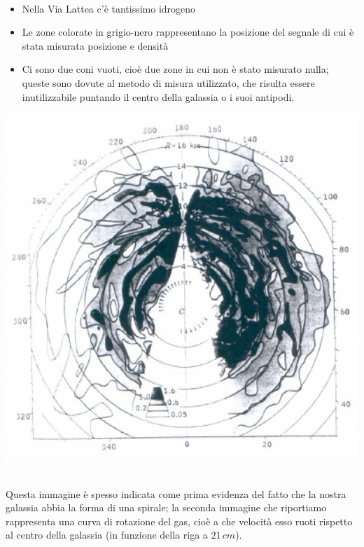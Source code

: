 \vspace{0.05cm}\\
\begin{minipage}{.65\textwidth}
\begin{itemize}
	\item Nella Via Lattea c'è tantissimo idrogeno
	\item Le zone colorate in grigio-nero rappresentano la posizione del segnale di cui è stata misurata posizione e densità
	\item Ci sono due coni vuoti, cioè due zone in cui non è stato misurato nulla; queste sono dovute al metodo di misura utilizzato, che risulta essere inutilizzabile puntando il centro della galassia o i suoi antipodi.
\end{itemize}
\end{minipage}
\begin{minipage}{.35\textwidth}
	\centering
	\includegraphics[width=1\textwidth]{Img/bertin_7.png}
\end{minipage}
\vspace{0.05cm}\\
Questa immagine è spesso indicata come prima evidenza del fatto che la nostra galassia abbia la forma di una spirale; la seconda immagine che riportiamo rappresenta una curva di rotazione del gas, cioè a che velocità esso ruoti rispetto al centro della galassia (in funzione della riga a $21 \, cm$).

